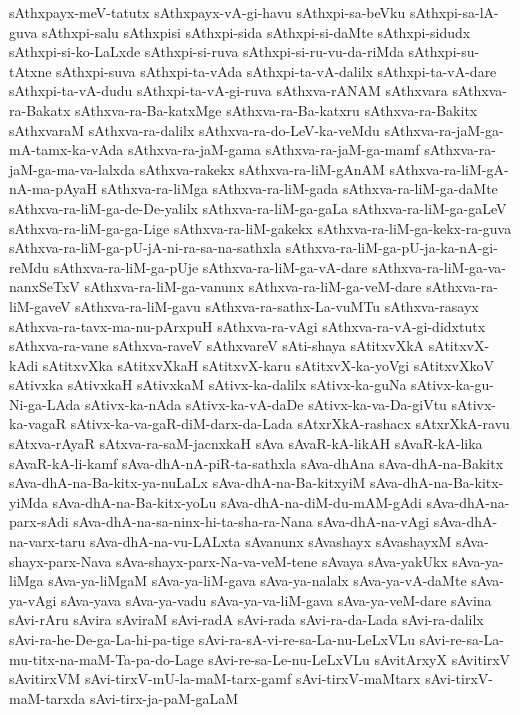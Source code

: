 {sAthxpayx-meV-tatutx
sAthxpayx-vA-gi-havu
sAthxpi-sa-beVku
sAthxpi-sa-lA-guva
sAthxpi-salu
sAthxpisi
sAthxpi-sida
sAthxpi-si-daMte
sAthxpi-sidudx
sAthxpi-si-ko-LaLxde
sAthxpi-si-ruva
sAthxpi-si-ru-vu-da-riMda
sAthxpi-su-tAtxne
sAthxpi-suva
sAthxpi-ta-vAda
sAthxpi-ta-vA-dalilx
sAthxpi-ta-vA-dare
sAthxpi-ta-vA-dudu
sAthxpi-ta-vA-gi-ruva
sAthxva-rANAM
sAthxvara
sAthxva-ra-Bakatx
sAthxva-ra-Ba-katxMge
sAthxva-ra-Ba-katxru
sAthxva-ra-Bakitx
sAthxvaraM
sAthxva-ra-dalilx
sAthxva-ra-do-LeV-ka-veMdu
sAthxva-ra-jaM-ga-mA-tamx-ka-vAda
sAthxva-ra-jaM-gama
sAthxva-ra-jaM-ga-mamf
sAthxva-ra-jaM-ga-ma-va-lalxda
sAthxva-rakekx
sAthxva-ra-liM-gAnAM
sAthxva-ra-liM-gA-nA-ma-pAyaH
sAthxva-ra-liMga
sAthxva-ra-liM-gada
sAthxva-ra-liM-ga-daMte
sAthxva-ra-liM-ga-de-De-yalilx
sAthxva-ra-liM-ga-gaLa
sAthxva-ra-liM-ga-gaLeV
sAthxva-ra-liM-ga-ga-Lige
sAthxva-ra-liM-gakekx
sAthxva-ra-liM-ga-kekx-ra-guva
sAthxva-ra-liM-ga-pU-jA-ni-ra-sa-na-sathxla
sAthxva-ra-liM-ga-pU-ja-ka-nA-gi-reMdu
sAthxva-ra-liM-ga-pUje
sAthxva-ra-liM-ga-vA-dare
sAthxva-ra-liM-ga-va-nanxSeTxV
sAthxva-ra-liM-ga-vanunx
sAthxva-ra-liM-ga-veM-dare
sAthxva-ra-liM-gaveV
sAthxva-ra-liM-gavu
sAthxva-ra-sathx-La-vuMTu
sAthxva-rasayx
sAthxva-ra-tavx-ma-nu-pArxpuH
sAthxva-ra-vAgi
sAthxva-ra-vA-gi-didxtutx
sAthxva-ra-vane
sAthxva-raveV
sAthxvareV
sAti-shaya
sAtitxvXkA
sAtitxvX-kAdi
sAtitxvXka
sAtitxvXkaH
sAtitxvX-karu
sAtitxvX-ka-yoVgi
sAtitxvXkoV
sAtivxka
sAtivxkaH
sAtivxkaM
sAtivx-ka-dalilx
sAtivx-ka-guNa
sAtivx-ka-gu-Ni-ga-LAda
sAtivx-ka-nAda
sAtivx-ka-vA-daDe
sAtivx-ka-va-Da-giVtu
sAtivx-ka-vagaR
sAtivx-ka-va-gaR-diM-darx-da-Lada
sAtxrXkA-rashacx
sAtxrXkA-ravu
sAtxva-rAyaR
sAtxva-ra-saM-jacnxkaH
sAva
sAvaR-kA-likAH
sAvaR-kA-lika
sAvaR-kA-li-kamf
sAva-dhA-nA-piR-ta-sathxla
sAva-dhAna
sAva-dhA-na-Bakitx
sAva-dhA-na-Ba-kitx-ya-nuLaLx
sAva-dhA-na-Ba-kitxyiM
sAva-dhA-na-Ba-kitx-yiMda
sAva-dhA-na-Ba-kitx-yoLu
sAva-dhA-na-diM-du-mAM-gAdi
sAva-dhA-na-parx-sAdi
sAva-dhA-na-sa-ninx-hi-ta-sha-ra-Nana
sAva-dhA-na-vAgi
sAva-dhA-na-varx-taru
sAva-dhA-na-vu-LALxta
sAvanunx
sAvashayx
sAvashayxM
sAva-shayx-parx-Nava
sAva-shayx-parx-Na-va-veM-tene
sAvaya
sAva-yakUkx
sAva-ya-liMga
sAva-ya-liMgaM
sAva-ya-liM-gava
sAva-ya-nalalx
sAva-ya-vA-daMte
sAva-ya-vAgi
sAva-yava
sAva-ya-vadu
sAva-ya-va-liM-gava
sAva-ya-veM-dare
sAvina
sAvi-rAru
sAvira
sAviraM
sAvi-radA
sAvi-rada
sAvi-ra-da-Lada
sAvi-ra-dalilx
sAvi-ra-he-De-ga-La-hi-pa-tige
sAvi-ra-sA-vi-re-sa-La-nu-LeLxVLu
sAvi-re-sa-La-mu-titx-na-maM-Ta-pa-do-Lage
sAvi-re-sa-Le-nu-LeLxVLu
sAvitArxyX
sAvitirxV
sAvitirxVM
sAvi-tirxV-mU-la-maM-tarx-gamf
sAvi-tirxV-maMtarx
sAvi-tirxV-maM-tarxda
sAvi-tirx-ja-paM-gaLaM
}
